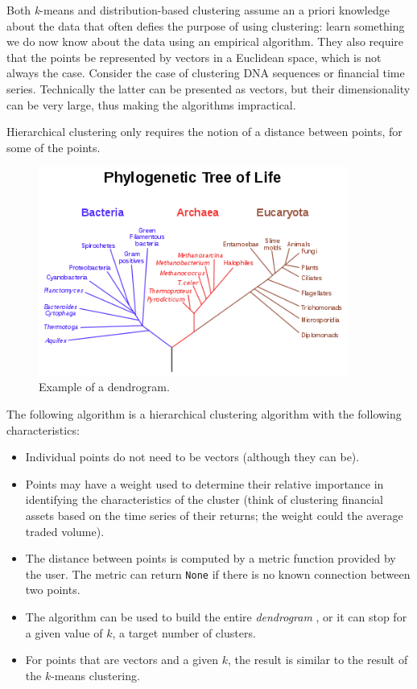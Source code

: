 \documentclass[justified,sixbynine]{tufte-book}
\def\ft{\small\tt}
\theoremstyle{plain}%
\theoremstyle{definition}
\theoremstyle{remark}
\begin{document}
\begin{fullwidth}
Both {\it k}-means and distribution-based clustering assume an a priori knowledge about the data that often defies the purpose of using clustering: learn something we do now know about the data using an empirical algorithm. They also require that the points be represented by vectors in a Euclidean space, which is not always the case. Consider the case of clustering DNA sequences or financial time series. Technically the latter can be presented as vectors, but their dimensionality can be very large, thus making the algorithms impractical.

Hierarchical clustering only requires the notion of a distance between points, for some of the points.

\begin{figure}[ht]
\centering\includegraphics[width=4in]{images/dendrogram.png}
\caption{Example of a dendrogram.}
\end{figure}

The following algorithm is a hierarchical clustering algorithm with the following characteristics:

\begin{itemize}
\item Individual points do not need to be vectors (although they can be).
\item Points may have a weight used to determine their relative importance in identifying the characteristics of the cluster (think of clustering financial assets based on the time series of their returns; the weight could the average traded volume).
\item The distance between points is computed by a metric function provided by the user. The metric can return {\ft None} if there is no known connection between two points.
\item The algorithm can be used to build the entire {\it dendrogram} , or it can stop for a given value of $k$, a target number of clusters.
\item For points that are vectors and a given $k$, the result is similar to the result of the $k$-means clustering.
\end{itemize}


\end{fullwidth}
\end{document}
